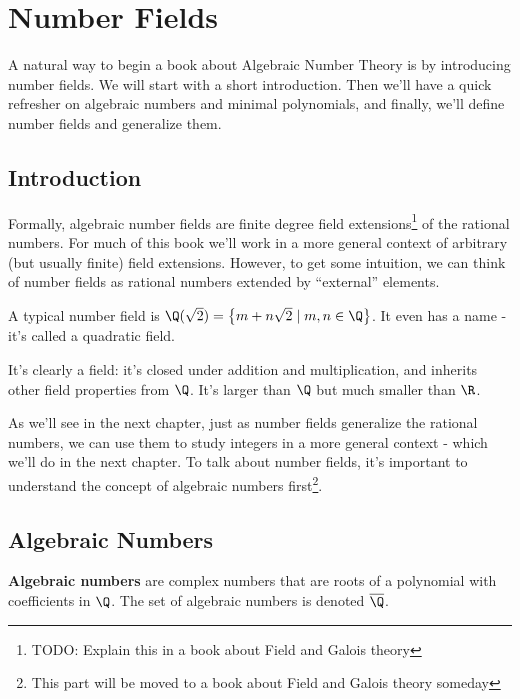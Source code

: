 \chapter{Number Fields}

A natural way to begin a book about Algebraic Number Theory is by introducing number fields.
We will start with a short introduction. Then we'll have a quick refresher on algebraic numbers and minimal polynomials, and finally, we'll define number fields and generalize them.

\section{Introduction}

Formally, algebraic number fields are finite degree field extensions\footnote{TODO: Explain this in a book about Field and Galois theory} of the rational numbers.
For much of this book we'll work in a more general context of arbitrary (but usually finite) field extensions. However, to get some intuition, we can think
of number fields as rational numbers extended by ``external'' elements.

\begin{ex}
    A typical number field is $\Q(\sqrt{2}) = \left\{m + n \sqrt{2} \mid m,n \in \Q\right\}$. It even has a name - it's called a quadratic field.
\end{ex}

It's clearly a field: it's closed under addition and multiplication, and inherits other field properties from $\Q$. It's larger than $\Q$ but much smaller than $\R$.

As we'll see in the next chapter, just as number fields generalize the rational numbers,
we can use them to study integers in a more general context - which we'll do in the next chapter.
To talk about number fields, it's important to understand the concept of algebraic numbers first\footnote{This part will be moved to a book about Field and Galois theory someday}.

\section{Algebraic Numbers}
\begin{df}
    \textbf{Algebraic numbers} are complex numbers that are roots of a polynomial with coefficients in $\Q$. The set of algebraic numbers is denoted $\overline{\Q}$.
\end{df}

